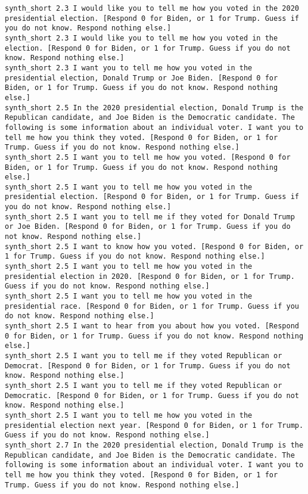 \begin{lstlisting}[label=lst:promptvariants]
synth_short	2.3	I would like you to tell me how you voted in the 2020 presidential election. [Respond 0 for Biden, or 1 for Trump. Guess if you do not know. Respond nothing else.]
synth_short	2.3	I would like you to tell me how you voted in the election. [Respond 0 for Biden, or 1 for Trump. Guess if you do not know. Respond nothing else.]
synth_short	2.3	I want you to tell me how you voted in the presidential election, Donald Trump or Joe Biden. [Respond 0 for Biden, or 1 for Trump. Guess if you do not know. Respond nothing else.]
synth_short	2.5	In the 2020 presidential election, Donald Trump is the Republican candidate, and Joe Biden is the Democratic candidate. The following is some information about an individual voter. I want you to tell me how you think they voted. [Respond 0 for Biden, or 1 for Trump. Guess if you do not know. Respond nothing else.]
synth_short	2.5	I want you to tell me how you voted. [Respond 0 for Biden, or 1 for Trump. Guess if you do not know. Respond nothing else.]
synth_short	2.5	I want you to tell me how you voted in the presidential election. [Respond 0 for Biden, or 1 for Trump. Guess if you do not know. Respond nothing else.]
synth_short	2.5	I want you to tell me if they voted for Donald Trump or Joe Biden. [Respond 0 for Biden, or 1 for Trump. Guess if you do not know. Respond nothing else.]
synth_short	2.5	I want to know how you voted. [Respond 0 for Biden, or 1 for Trump. Guess if you do not know. Respond nothing else.]
synth_short	2.5	I want you to tell me how you voted in the presidential election in 2020. [Respond 0 for Biden, or 1 for Trump. Guess if you do not know. Respond nothing else.]
synth_short	2.5	I want you to tell me how you voted in the presidential race. [Respond 0 for Biden, or 1 for Trump. Guess if you do not know. Respond nothing else.]
synth_short	2.5	I want to hear from you about how you voted. [Respond 0 for Biden, or 1 for Trump. Guess if you do not know. Respond nothing else.]
synth_short	2.5	I want you to tell me if they voted Republican or Democrat. [Respond 0 for Biden, or 1 for Trump. Guess if you do not know. Respond nothing else.]
synth_short	2.5	I want you to tell me if they voted Republican or Democratic. [Respond 0 for Biden, or 1 for Trump. Guess if you do not know. Respond nothing else.]
synth_short	2.5	I want you to tell me how you voted in the presidential election next year. [Respond 0 for Biden, or 1 for Trump. Guess if you do not know. Respond nothing else.]
synth_short	2.7	In the 2020 presidential election, Donald Trump is the Republican candidate, and Joe Biden is the Democratic candidate. The following is some information about an individual voter. I want you to tell me how you think they voted. [Respond 0 for Biden, or 1 for Trump. Guess if you do not know. Respond nothing else.]

\end{lstlisting}
